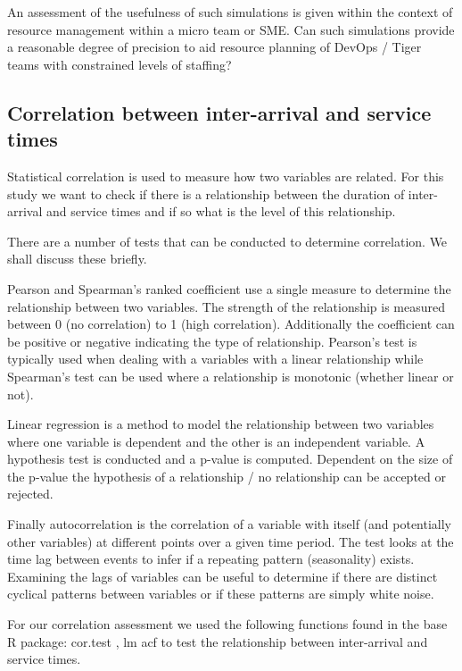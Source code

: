 \documentclass[5p]{elsarticle}
\begin{document}
An assessment of the usefulness of such simulations is given within the context of resource management within a micro team or SME. Can such simulations provide a reasonable degree of precision to aid resource planning of DevOps / Tiger teams with constrained levels of staffing?


\subsection{Correlation between inter-arrival and service times}

Statistical correlation is used to measure how two variables are related. For this study we want to check if there is a relationship between the duration of inter-arrival and service times and if so what is the level of this relationship. 

There are a number of tests that can be conducted to determine correlation. We shall discuss these briefly.

Pearson \cite{fisher1915frequency} and Spearman's \cite{spearman1904proof} ranked coefficient use a single measure to determine the relationship between two variables. The strength of the relationship is measured between 0 (no correlation) to 1 (high correlation). Additionally the coefficient can be positive or negative indicating the type of relationship. Pearson's test is typically used when dealing with a variables with a linear relationship while Spearman's test can be used where a relationship is monotonic (whether linear or not). 

Linear regression \cite{galton1890kinship} is a method to model the relationship between two variables where one variable is dependent and the other is an  independent variable. A hypothesis test is conducted and a p-value is computed. Dependent on the size of the p-value the hypothesis of a relationship / no relationship can be accepted or rejected.

Finally autocorrelation \cite{box1970distribution} is the correlation of a variable with itself (and potentially other variables) at different points over a given time period. The test looks at the time lag between events to infer if a repeating pattern (seasonality) exists. Examining the lags of variables can be useful to determine if there are distinct cyclical patterns between variables or if these patterns are simply white noise.

For our correlation assessment we used the following functions found in the base R package: cor.test \cite{PearSpearR}, lm \cite{lmR} acf \cite{acfR} to test the relationship between inter-arrival and service times.
\end{document}
